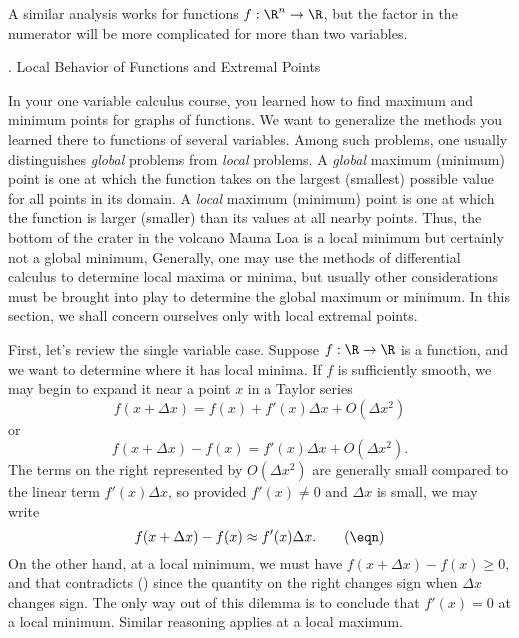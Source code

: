 A similar analysis works for functions $f:\R^n \to \R$, but the
factor in the numerator will be more complicated for more than
two variables.
\bigskip

\bigskip
{}
\head \sn. Local Behavior of Functions and Extremal Points \endhead

In your one variable calculus course, you learned how to find
maximum and minimum points for graphs of functions.   We want
to generalize the methods you learned there to functions of
several variables.   Among such problems, one usually distinguishes
{\it global\/} problems from {\it local\/} problems.  A
{\it global\/} maximum (minimum) point is one at which the
function takes on the largest (smallest) possible value for
all points in its domain.  A {\it local\/} maximum (minimum)
point is one at which the function is larger (smaller)
than its values at all nearby points. 
Thus, the bottom of the crater in the volcano Mauna Loa is a local
minimum but certainly not a global minimum,   Generally, one may use
the methods of differential calculus to determine local
maxima or minima, but usually other considerations must be
brought into play to determine the global maximum or minimum.
In this section, we shall concern ourselves only with 
local extremal points.

First, let's review the single variable case.   Suppose
$f:\R \to \R$ is a function, and we want to determine
where it has local minima.  If $f$ is sufficiently smooth,
we may begin to expand it near a point $x$ in a Taylor series 
$$
f(x + \Delta x) = f(x) + f'(x)\Delta x +  O(\Delta x^2)
$$
or
$$
f(x + \Delta x) - f(x) = f'(x)\Delta x + O(\Delta x^2).
$$
The terms on the right represented by $O(\Delta x^2)$ are generally
small compared to the linear term $f'(x)\Delta x$, so provided
$f'(x) \not = 0$ and $\Delta x$ is small, we may write
\nexteqn
$$
f(x + \Delta x) - f(x) \approx f'(x)\Delta x. \tag\eqn
$$
 On the other hand, at a local minimum,
we must have  $f(x + \Delta x) - f(x) \ge 0$, and that contradicts
(\eqn) since the quantity on the right changes sign when $\Delta x$
changes sign.  The only way out of this dilemma is to conclude
that $f'(x) = 0$ at a local minimum. 
  Similar reasoning applies at
a local maximum.

